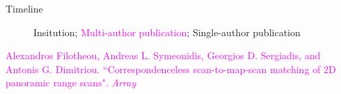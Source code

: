 \begin{frame}{Timeline}

\begin{figure}[t!] \centering
        
        \caption{\textcolor[RGB]{32,74,135}{Insitution}; \textcolor{magenta}{Multi-author publication}; \textcolor[RGB]{78,154,0}{Single-author publication}}
\end{figure}

\placebottom \tiny
\textcolor{magenta}{Alexandros Filotheou, Andreas L. Symeonidis, Georgios D. Sergiadis, and Antonis G. Dimitriou.
``Correspondenceless scan-to-map-scan matching of 2D panoramic range scans".  \textit{Array}}

\end{frame}
